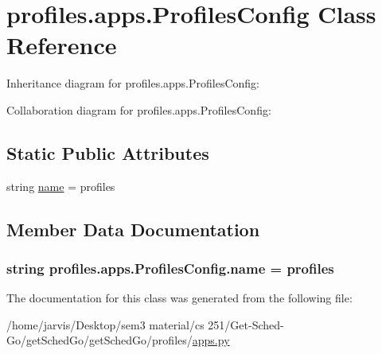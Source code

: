 \hypertarget{classprofiles_1_1apps_1_1ProfilesConfig}{}\section{profiles.\+apps.\+Profiles\+Config Class Reference}
\label{classprofiles_1_1apps_1_1ProfilesConfig}


Inheritance diagram for profiles.\+apps.\+Profiles\+Config\+:


Collaboration diagram for profiles.\+apps.\+Profiles\+Config\+:
\subsection*{Static Public Attributes}
\begin{DoxyCompactItemize}
\item 
string \hyperlink{classprofiles_1_1apps_1_1ProfilesConfig_ae4a549edec02587ca86bd547975f5f5e}{name} = \textquotesingle{}profiles\textquotesingle{}
\end{DoxyCompactItemize}


\subsection{Member Data Documentation}
\subsubsection[{\texorpdfstring{name}{name}}]{\setlength{\rightskip}{0pt plus 5cm}string profiles.\+apps.\+Profiles\+Config.\+name = \textquotesingle{}profiles\textquotesingle{}\hspace{0.3cm}{\ttfamily [static]}}\hypertarget{classprofiles_1_1apps_1_1ProfilesConfig_ae4a549edec02587ca86bd547975f5f5e}{}\label{classprofiles_1_1apps_1_1ProfilesConfig_ae4a549edec02587ca86bd547975f5f5e}


The documentation for this class was generated from the following file\+:\begin{DoxyCompactItemize}
\item 
/home/jarvis/\+Desktop/sem3 material/cs 251/\+Get-\/\+Sched-\/\+Go/get\+Sched\+Go/get\+Sched\+Go/profiles/\hyperlink{profiles_2apps_8py}{apps.\+py}\end{DoxyCompactItemize}
